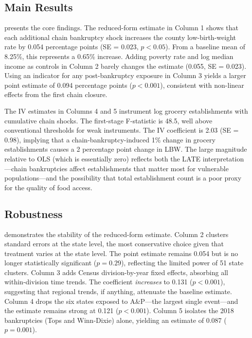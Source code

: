 \documentclass[12pt]{article}
\begin{document}
\subsection{Main Results}

 presents the core findings. The reduced-form estimate in Column 1 shows that each additional chain bankruptcy shock increases the county low-birth-weight rate by 0.054 percentage points (SE = 0.023, $p < 0.05$). From a baseline mean of 8.25\%, this represents a 0.65\% increase. Adding poverty rate and log median income as controls in Column 2 barely changes the estimate (0.055, SE = 0.023). Using an indicator for any post-bankruptcy exposure in Column 3 yields a larger point estimate of 0.094 percentage points ($p < 0.001$), consistent with non-linear effects from the first chain closure.

The IV estimates in Columns 4 and 5 instrument log grocery establishments with cumulative chain shocks. The first-stage F-statistic is 48.5, well above conventional thresholds for weak instruments. The IV coefficient is 2.03 (SE = 0.98), implying that a chain-bankruptcy-induced 1\% change in grocery establishments causes a 2 percentage point change in LBW. The large magnitude relative to OLS (which is essentially zero) reflects both the LATE interpretation---chain bankruptcies affect establishments that matter most for vulnerable populations---and the possibility that total establishment count is a poor proxy for the quality of food access.



\subsection{Robustness}

 demonstrates the stability of the reduced-form estimate. Column 2 clusters standard errors at the state level, the most conservative choice given that treatment varies at the state level. The point estimate remains 0.054 but is no longer statistically significant ($p = 0.29$), reflecting the limited power of 51 state clusters. Column 3 adds Census division-by-year fixed effects, absorbing all within-division time trends. The coefficient \textit{increases} to 0.131 ($p < 0.001$), suggesting that regional trends, if anything, attenuate the baseline estimate. Column 4 drops the six states exposed to A\&P---the largest single event---and the estimate remains strong at 0.121 ($p < 0.001$). Column 5 isolates the 2018 bankruptcies (Tops and Winn-Dixie) alone, yielding an estimate of 0.087 ($p = 0.001$).
\end{document}
